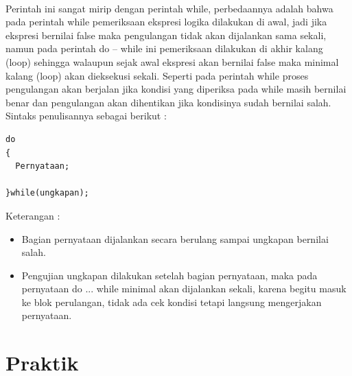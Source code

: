 \documentclass[a4paper,12pt]{article}
\begin{document}
\paragraph{}
Perintah ini sangat mirip dengan perintah while, perbedaannya adalah bahwa pada perintah while pemeriksaan ekspresi logika dilakukan di awal, jadi jika ekspresi bernilai false maka pengulangan tidak akan dijalankan sama sekali, namun pada perintah do – while ini pemeriksaan dilakukan di akhir kalang (loop) sehingga walaupun sejak awal ekspresi akan bernilai false maka minimal kalang (loop) akan dieksekusi sekali. Seperti pada perintah while proses pengulangan akan berjalan jika kondisi yang diperiksa pada while masih bernilai benar dan pengulangan akan dihentikan jika kondisinya sudah bernilai salah.\\
Sintaks penulisannya sebagai berikut :
\begin{lstlisting}[frame=single]
do
{
  Pernyataan;

}while(ungkapan);

\end{lstlisting}

Keterangan :
\begin{itemize}[label={-}]
	\item Bagian pernyataan dijalankan secara berulang sampai ungkapan bernilai salah.
	
	\item Pengujian ungkapan dilakukan setelah bagian pernyataan, maka pada pernyataan do ... while minimal akan dijalankan sekali, karena begitu masuk ke blok perulangan, tidak ada cek kondisi tetapi langsung mengerjakan pernyataan.
\end{itemize}

\section{Praktik}
\end{document}
